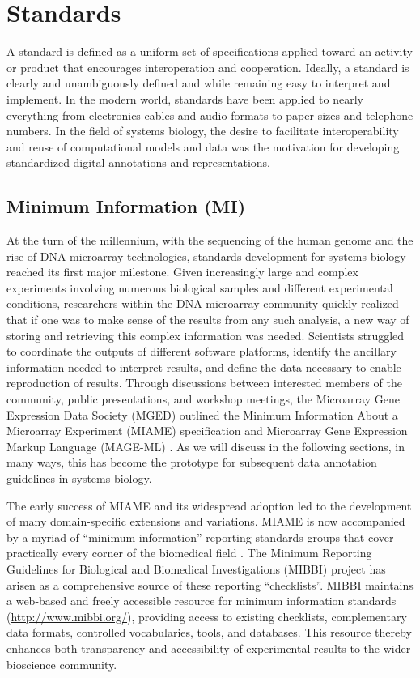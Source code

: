 \section{Standards}

A standard is defined as a uniform set of specifications applied toward
an activity or product that encourages interoperation and cooperation.
Ideally, a standard is clearly and unambiguously defined and while
remaining easy to interpret and implement. In the modern world,
standards have been applied to nearly everything from electronics cables
and audio formats to paper sizes and telephone numbers. In the field of
systems biology, the desire to facilitate interoperability and reuse of
computational models and data was the motivation for developing
standardized digital annotations and representations.

\subsection{Minimum Information (MI)}

At the turn of the millennium, with the sequencing of the human genome
and the rise of DNA microarray technologies, standards development for
systems biology reached its first major milestone. Given increasingly
large and complex experiments involving numerous biological samples and
different experimental conditions, researchers within the DNA microarray
community quickly realized that if one was to make sense of the results
from any such analysis, a new way of storing and retrieving this complex
information was needed. Scientists struggled to coordinate the outputs
of different software platforms, identify the ancillary information
needed to interpret results, and define the data necessary to enable
reproduction of results. Through discussions between interested members
of the community, public presentations, and workshop meetings, the
Microarray Gene Expression Data Society (MGED) outlined the Minimum
Information About a Microarray Experiment (MIAME) specification
\autocite{brazma2001minimum} and Microarray Gene Expression Markup
Language (MAGE-ML) \autocite{spellman2002design}. As we will discuss in
the following sections, in many ways, this has become the prototype
\autocite{quackenbush2006standardizing} for subsequent data annotation
guidelines in systems biology.

The early success of MIAME and its widespread adoption led to the
development of many domain-specific extensions and variations. MIAME is
now accompanied by a myriad of ``minimum information'' reporting
standards groups that cover practically every corner of the biomedical
field \autocite{naturebiotechnology2006}. The Minimum Reporting
Guidelines for Biological and Biomedical Investigations (MIBBI)
\autocite{taylor2008promoting} project has arisen as a comprehensive
source of these reporting ``checklists''. MIBBI maintains a web-based
and freely accessible resource for minimum information standards
(\url{http://www.mibbi.org/}), providing access to existing checklists,
complementary data formats, controlled vocabularies, tools, and
databases. This resource thereby enhances both transparency and
accessibility of experimental results to the wider bioscience community.

